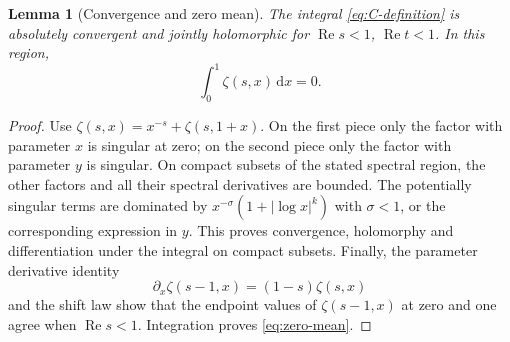 \documentclass[11pt]{article}
\numberwithin{equation}{section}
\newtheorem{lemma}[theorem]{Lemma}
\theoremstyle{definition}
\theoremstyle{remark}
\DeclareMathOperator{\Rea}{Re}
\newcommand{\dd}{\,\mathrm d}
\begin{document}
\begin{lemma}[Convergence and zero mean]
\label{lem:convergence}
The integral \eqref{eq:C-definition} is absolutely convergent and jointly
holomorphic for $\Rea s<1$, $\Rea t<1$. In this region,
\begin{equation}
 \int_0^1\zeta(s,x)\dd x=0.
 \label{eq:zero-mean}
\end{equation}
\end{lemma}
\begin{proof}
Use $\zeta(s,x)=x^{-s}+\zeta(s,1+x)$.
On the first piece only the factor with parameter $x$ is singular at
zero; on the second piece only the factor with parameter $y$ is singular.
On compact subsets of the stated spectral region, the other factors and
all their spectral derivatives are bounded. The potentially singular
terms are dominated by $x^{-\sigma}(1+|\log x|^k)$ with $\sigma<1$,
or the corresponding expression in $y$. This proves convergence,
holomorphy and differentiation under the integral on compact subsets.
Finally, the parameter derivative identity
\begin{equation}
 \partial_x\zeta(s-1,x)=(1-s)\zeta(s,x)
 \label{eq:hurwitz-derivative}
\end{equation}
and the shift law show that the endpoint values of
$\zeta(s-1,x)$ at zero and one agree when $\Rea s<1$.
Integration proves \eqref{eq:zero-mean}.
\end{proof}
\end{document}
